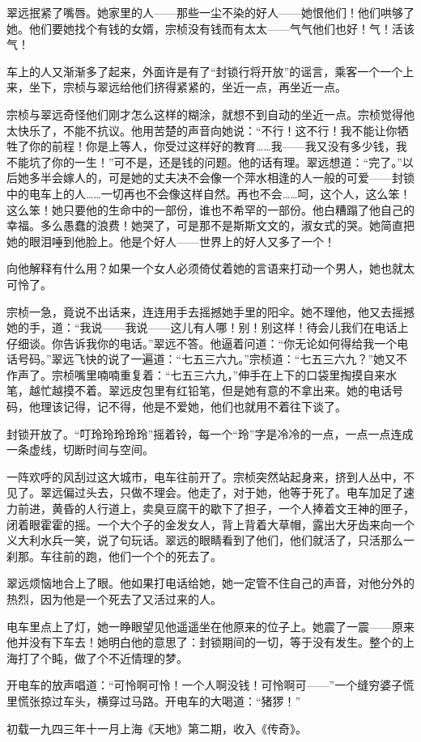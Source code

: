 \par 翠远抿紧了嘴唇。她家里的人——那些一尘不染的好人——她恨他们！他们哄够了她。他们要她找个有钱的女婿，宗桢没有钱而有太太——气气他们也好！气！活该气！
\par 车上的人又渐渐多了起来，外面许是有了“封锁行将开放”的谣言，乘客一个一个上来，坐下，宗桢与翠远给他们挤得紧紧的，坐近一点，再坐近一点。
\par 宗桢与翠远奇怪他们刚才怎么这样的糊涂，就想不到自动的坐近一点。宗桢觉得他太快乐了，不能不抗议。他用苦楚的声音向她说：“不行！这不行！我不能让你牺牲了你的前程！你是上等人，你受过这样好的教育……我——我又没有多少钱，我不能坑了你的一生！”可不是，还是钱的问题。他的话有理。翠远想道：“完了。”以后她多半会嫁人的，可是她的丈夫决不会像一个萍水相逢的人一般的可爱——封锁中的电车上的人……一切再也不会像这样自然。再也不会……呵，这个人，这么笨！这么笨！她只要他的生命中的一部份，谁也不希罕的一部份。他白糟蹋了他自己的幸福。多么愚蠢的浪费！她哭了，可是那不是斯斯文文的，淑女式的哭。她简直把她的眼泪唾到他脸上。他是个好人——世界上的好人又多了一个！
\par 向他解释有什么用？如果一个女人必须倚仗着她的言语来打动一个男人，她也就太可怜了。
\par 宗桢一急，竟说不出话来，连连用手去摇撼她手里的阳伞。她不理他，他又去摇撼她的手，道：“我说——我说——这儿有人哪！别！别这样！待会儿我们在电话上仔细谈。你告诉我你的电话。”翠远不答。他逼着问道：“你无论如何得给我一个电话号码。”翠远飞快的说了一遍道：“七五三六九。”宗桢道：“七五三六九？”她又不作声了。宗桢嘴里喃喃重复着：“七五三六九，”伸手在上下的口袋里掏摸自来水笔，越忙越摸不着。翠远皮包里有红铅笔，但是她有意的不拿出来。她的电话号码，他理该记得，记不得，他是不爱她，他们也就用不着往下谈了。
\par 封锁开放了。“叮玲玲玲玲玲”摇着铃，每一个“玲”字是冷冷的一点，一点一点连成一条虚线，切断时间与空间。
\par 一阵欢呼的风刮过这大城市，电车往前开了。宗桢突然站起身来，挤到人丛中，不见了。翠远偏过头去，只做不理会。他走了，对于她，他等于死了。电车加足了速力前进，黄昏的人行道上，卖臭豆腐干的歇下了担子，一个人捧着文王神的匣子，闭着眼霍霍的摇。一个大个子的金发女人，背上背着大草帽，露出大牙齿来向一个义大利水兵一笑，说了句玩话。翠远的眼睛看到了他们，他们就活了，只活那么一刹那。车往前的跑，他们一个个的死去了。
\par 翠远烦恼地合上了眼。他如果打电话给她，她一定管不住自己的声音，对他分外的热烈，因为他是一个死去了又活过来的人。
\par 电车里点上了灯，她一睁眼望见他遥遥坐在他原来的位子上。她震了一震——原来他并没有下车去！她明白他的意思了：封锁期间的一切，等于没有发生。整个的上海打了个盹，做了个不近情理的梦。
\par 开电车的放声唱道：“可怜啊可怜！一个人啊没钱！可怜啊可——”一个缝穷婆子慌里慌张掠过车头，横穿过马路。开电车的大喝道：“猪猡！”
\par {}
\par *初载一九四三年十一月上海《天地》第二期，收入《传奇》。



